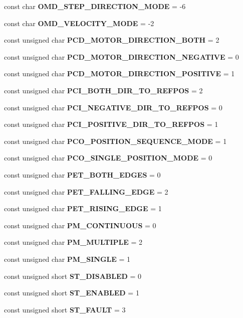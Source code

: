 \begin{DoxyCompactItemize}
\item 
const char {\bf \-O\-M\-D\-\_\-\-S\-T\-E\-P\-\_\-\-D\-I\-R\-E\-C\-T\-I\-O\-N\-\_\-\-M\-O\-D\-E} = -\/6
\item 
const char {\bf \-O\-M\-D\-\_\-\-V\-E\-L\-O\-C\-I\-T\-Y\-\_\-\-M\-O\-D\-E} = -\/2
\item 
const unsigned char {\bf \-P\-C\-D\-\_\-\-M\-O\-T\-O\-R\-\_\-\-D\-I\-R\-E\-C\-T\-I\-O\-N\-\_\-\-B\-O\-T\-H} = 2
\item 
const unsigned char {\bf \-P\-C\-D\-\_\-\-M\-O\-T\-O\-R\-\_\-\-D\-I\-R\-E\-C\-T\-I\-O\-N\-\_\-\-N\-E\-G\-A\-T\-I\-V\-E} = 0
\item 
const unsigned char {\bf \-P\-C\-D\-\_\-\-M\-O\-T\-O\-R\-\_\-\-D\-I\-R\-E\-C\-T\-I\-O\-N\-\_\-\-P\-O\-S\-I\-T\-I\-V\-E} = 1
\item 
const unsigned char {\bf \-P\-C\-I\-\_\-\-B\-O\-T\-H\-\_\-\-D\-I\-R\-\_\-\-T\-O\-\_\-\-R\-E\-F\-P\-O\-S} = 2
\item 
const unsigned char {\bf \-P\-C\-I\-\_\-\-N\-E\-G\-A\-T\-I\-V\-E\-\_\-\-D\-I\-R\-\_\-\-T\-O\-\_\-\-R\-E\-F\-P\-O\-S} = 0
\item 
const unsigned char {\bf \-P\-C\-I\-\_\-\-P\-O\-S\-I\-T\-I\-V\-E\-\_\-\-D\-I\-R\-\_\-\-T\-O\-\_\-\-R\-E\-F\-P\-O\-S} = 1
\item 
const unsigned char {\bf \-P\-C\-O\-\_\-\-P\-O\-S\-I\-T\-I\-O\-N\-\_\-\-S\-E\-Q\-U\-E\-N\-C\-E\-\_\-\-M\-O\-D\-E} = 1
\item 
const unsigned char {\bf \-P\-C\-O\-\_\-\-S\-I\-N\-G\-L\-E\-\_\-\-P\-O\-S\-I\-T\-I\-O\-N\-\_\-\-M\-O\-D\-E} = 0
\item 
const unsigned char {\bf \-P\-E\-T\-\_\-\-B\-O\-T\-H\-\_\-\-E\-D\-G\-E\-S} = 0
\item 
const unsigned char {\bf \-P\-E\-T\-\_\-\-F\-A\-L\-L\-I\-N\-G\-\_\-\-E\-D\-G\-E} = 2
\item 
const unsigned char {\bf \-P\-E\-T\-\_\-\-R\-I\-S\-I\-N\-G\-\_\-\-E\-D\-G\-E} = 1
\item 
const unsigned char {\bf \-P\-M\-\_\-\-C\-O\-N\-T\-I\-N\-U\-O\-U\-S} = 0
\item 
const unsigned char {\bf \-P\-M\-\_\-\-M\-U\-L\-T\-I\-P\-L\-E} = 2
\item 
const unsigned char {\bf \-P\-M\-\_\-\-S\-I\-N\-G\-L\-E} = 1
\item 
const unsigned short {\bf \-S\-T\-\_\-\-D\-I\-S\-A\-B\-L\-E\-D} = 0
\item 
const unsigned short {\bf \-S\-T\-\_\-\-E\-N\-A\-B\-L\-E\-D} = 1
\item 
const unsigned short {\bf \-S\-T\-\_\-\-F\-A\-U\-L\-T} = 3

\end{DoxyCompactItemize}
